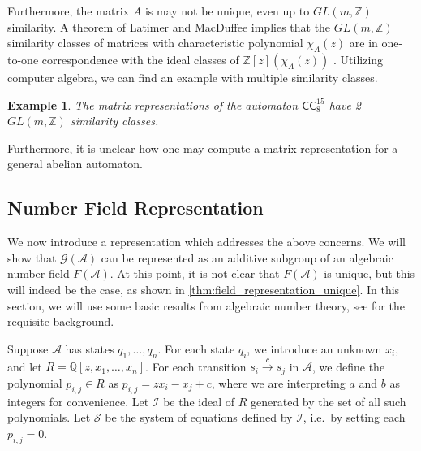\documentclass[12pt, letterpaper]{article}
\newcommand{\Z}{\mathbb Z}
\newcommand{\Q}{\mathbb Q}
\newcommand{\A}{\mathcal A}
\newcommand{\CC}{\mathsf{CC}}
\newcommand{\I}{\mathcal I}
\renewcommand{\S}{\mathcal S}
\newcommand{\gp}{\mathcal G}
\newtheorem{example}[thm]{Example}
\begin{document}
Furthermore, the matrix $A$ is may not be unique, even up to $GL(m, \Z)$
similarity.  A theorem of Latimer and MacDuffee implies that the $GL(m, \Z)$
similarity classes of matrices with characteristic polynomial $\chi_A(z)$ are
in one-to-one correspondence with the ideal classes of $\Z[z](\chi_A(z))$
\cite{latimer-macduffee}.  Utilizing computer algebra, we can find an example
with multiple similarity classes.
\begin{example}
    The matrix representations of the automaton $\CC^{15}_8$ have 2
    $GL(m, \Z)$ similarity classes.
\end{example}

Furthermore, it is unclear how one may compute a matrix representation for
a general abelian automaton.

\subsection{Number Field Representation}\label{sec:field-rep}
We now introduce a representation which addresses the above concerns.  We will
show that $\gp(\A)$ can be represented as an additive subgroup of an algebraic
number field $F(\A)$. At this point, it is not clear that $F(\A)$ is unique,
but this will indeed be the case, as shown in
\cref{thm:field_representation_unique}.  In this section, we will use some
basic results from algebraic number theory, see \cite{ireland1990classical,
    stein2012algebraic} for the requisite background.

Suppose $\A$ has states $q_1, \ldots, q_n$. For each state $q_i$, we introduce
an unknown $x_i$, and let $R = \Q[z, x_1, \ldots, x_n]$. For each transition
$s_i \xrightarrow{c} s_j$ in $\A$, we define the polynomial
$p_{i,j} \in R$ as $p_{i,j} = z x_i - x_j + c$, where we are interpreting
$a$ and $b$ as integers for convenience.  Let $\I$ be the ideal of $R$
generated by the set of all such polynomials.  Let $\S$ be the system of
equations defined by $\I$, i.e.\ by setting each $p_{i,j} = 0$.
\end{document}
